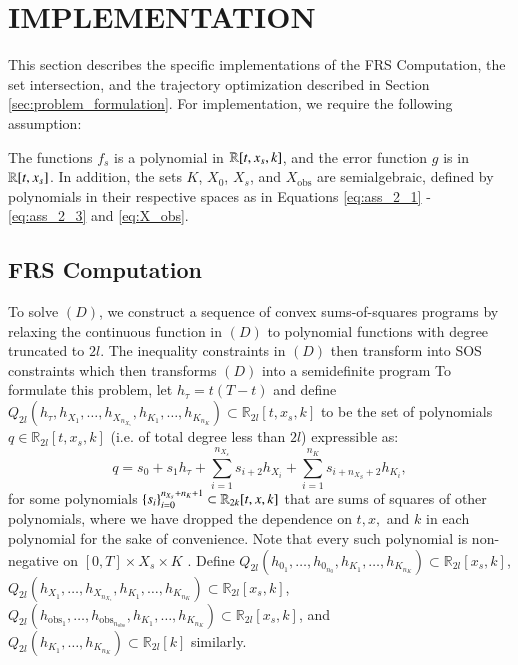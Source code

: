 \section{IMPLEMENTATION}
\label{sec:implementation}

This section describes the specific implementations of the FRS Computation, the set intersection, and the trajectory optimization described in Section \ref{sec:problem_formulation}.
For implementation, we require the following assumption:
\begin{assum}
The functions $f_s$ is a polynomial in $\mathbb{R}[t,x_s,k]$, and the error function $g$ is in $\mathbb{R}[t,x_s]$. In addition, the sets $K$, $X_0$, $X_s$, and $X_\text{obs}$ are semialgebraic, defined by polynomials in their respective spaces as in Equations \eqref{eq:ass_2_1} - \eqref{eq:ass_2_3} and \eqref{eq:X_obs}.
\end{assum}

\subsection{FRS Computation}
\label{subsec:frs_imp}

To solve $(D)$, we construct a sequence of convex sums-of-squares programs by relaxing the continuous function in $(D)$ to polynomial functions with degree truncated to $2l$. 
The inequality constraints in $(D)$ then transform into SOS constraints which then transforms $(D)$ into a semidefinite program\cite{parrilo2000structured}
To formulate this problem, let $h_{\tau} = t(T - t)$ and define $Q_{2l}(h_{\tau},h_{X_1},\ldots,h_{X_{n_{X_s}}},h_{K_1},\ldots,h_{K_{n_K}}) \subset \mathbb{R}_{2l}[t,x_s,k]$ to be the set of polynomials $q \in \mathbb{R}_{2l}[t,x_s,k]$ (i.e. of total degree less than $2l$) expressible as:
\begin{equation}
  q = s_0 + s_1 h_{\tau} + \sum_{i=1}^{n_{X_s}} s_{i+2} h_{X_i} + \sum_{i=1}^{n_{K}} s_{i+{n_{X_S}}+2} h_{K_i},
\end{equation}
for some polynomials $\{s_i\}_{i=0}^{n_{X_s}+n_{K}+1} \subset \mathbb{R}_{2k}[t,x,k]$ that are sums of squares of other polynomials, where we have dropped the dependence on $t,x,$ and $k$ in each polynomial for the sake of convenience.
Note that every such polynomial is non-negative on $[0,T] \times X_s \times K$ \cite[Theorem 2.14]{lasserre2009moments}.
Define $Q_{2l} (h_{0_1},\ldots,h_{0_{n_0}},h_{K_1},\ldots,h_{K_{n_K}}) \subset \mathbb{R}_{2l}[x_s,k]$, $Q_{2l} (h_{X_1},\ldots,h_{X_{n_{X_s}}},h_{K_1},\ldots,h_{K_{n_K}}) \subset \mathbb{R}_{2l}[x_s,k]$, $Q_{2l} (h_{\text{obs}_1},\ldots,h_{\text{obs}_{n_\text{obs}}},h_{K_1},\ldots, h_{K_{n_K}}) \subset \mathbb{R}_{2l}[x_s,k]$, and $Q_{2l}(h_{K_1},\ldots, h_{K_{n_K}}) \subset \mathbb{R}_{2l}[k]$ similarly.

